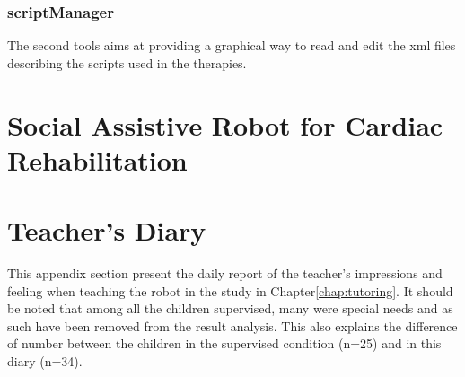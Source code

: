 \subsection{scriptManager}

The second tools aims at providing a graphical way to read and edit the xml files describing the scripts used in the therapies.

\cleartooddpage
\chapter{Social Assistive Robot for Cardiac Rehabilitation} \label{app:Colombia}


\cleartooddpage
\chapter{Teacher's Diary} \label{app:diary}
This appendix section present the daily report of the teacher's impressions and feeling when teaching the robot in the study in Chapter\ref{chap:tutoring}. It should be noted that among all the children supervised, many were special needs and as such have been removed from the result analysis. This also explains the difference of number between the children in the supervised condition (n=25) and in this diary (n=34).

